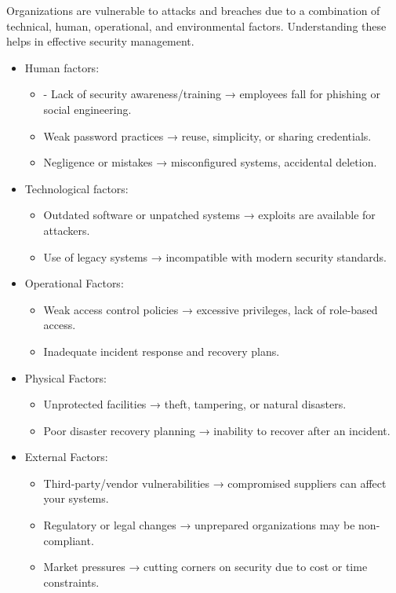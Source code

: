 \indent 

Organizations are vulnerable to attacks and breaches due to a combination of technical, human, operational, and environmental factors. Understanding these helps in effective security management.

\begin{itemize}
    \item Human factors:
        \begin{itemize}
            \item - Lack of security awareness/training → employees fall for phishing or social engineering.
            \item Weak password practices → reuse, simplicity, or sharing credentials.
            \item Negligence or mistakes → misconfigured systems, accidental deletion.
        \end{itemize}
    \item Technological factors:
        \begin{itemize}
            \item Outdated software or unpatched systems → exploits are available for attackers.
            \item Use of legacy systems → incompatible with modern security standards.
        \end{itemize}
    \item Operational Factors:
        \begin{itemize}
            \item Weak access control policies → excessive privileges, lack of role-based access.
            \item Inadequate incident response and recovery plans.
        \end{itemize}
    \item Physical Factors:
        \begin{itemize}
            \item Unprotected facilities → theft, tampering, or natural disasters.
            \item Poor disaster recovery planning → inability to recover after an incident.
        \end{itemize}
    \item External Factors:
        \begin{itemize}
            \item Third-party/vendor vulnerabilities → compromised suppliers can affect your systems.
            \item Regulatory or legal changes → unprepared organizations may be non-compliant.
            \item Market pressures → cutting corners on security due to cost or time constraints.
        \end{itemize}
\end{itemize}


